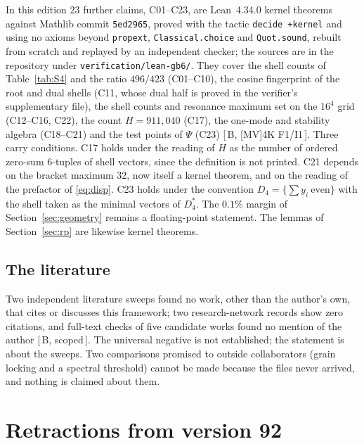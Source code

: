 \documentclass[a4paper,11pt]{article}
\numberwithin{equation}{section}
\theoremstyle{jsplain}
\theoremstyle{jsrem}
\newcommand{\grade}[1]{[\,#1\,]}
\begin{document}
In this edition $23$ further claims, C01--C23, are Lean~4.34.0 kernel theorems against Mathlib commit \texttt{5ed2965}, proved with the tactic \texttt{decide +kernel} and using no axioms beyond \texttt{propext}, \texttt{Classical.choice} and \texttt{Quot.sound}, rebuilt from scratch and replayed by an independent checker; the sources are in the repository under \texttt{verification/lean-gb6/}. They cover the shell counts of Table~\ref{tab:S4} and the ratio $496/423$ (C01--C10), the cosine fingerprint of the root and dual shells (C11, whose dual half is proved in the verifier's supplementary file), the shell counts and resonance maximum set on the $16^4$ grid (C12--C16, C22), the count $H=911{,}040$ (C17), the one-mode and stability algebra (C18--C21) and the test points of $\Psi$ (C23) \grade{B, [MV]4K F1/I1}. Three carry conditions. C17 holds under the reading of $H$ as the number of ordered zero-sum $6$-tuples of shell vectors, since the definition is not printed. C21 depends on the bracket maximum $32$, now itself a kernel theorem, and on the reading of the prefactor of \eqref{eq:disp}. C23 holds under the convention $D_4=\{\sum y_i\ \text{even}\}$ with the shell taken as the minimal vectors of $D_4^*$. The $0.1\%$ margin of Section~\ref{sec:geometry} remains a floating-point statement. The lemmas of Section~\ref{sec:rp} are likewise kernel theorems.

\subsection{The literature}

Two independent literature sweeps found no work, other than the author's own, that cites or discusses this framework; two research-network records show zero citations, and full-text checks of five candidate works found no mention of the author \grade{B, scoped}. The universal negative is not established; the statement is about the sweeps. Two comparisons promised to outside collaborators (grain locking and a spectral threshold) cannot be made because the files never arrived, and nothing is claimed about them.

\section{Retractions from version 92}\label{sec:retractions}
\end{document}
